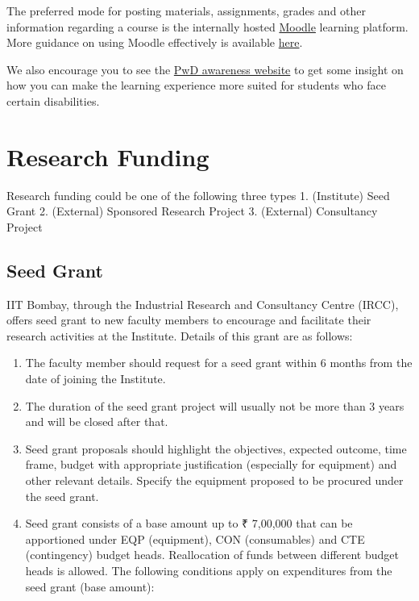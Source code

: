 \documentclass[
  10pt,
  a5paper,
  10pt,
  openany]{amsbook}
\providecommand{\tightlist}{%
  \setlength{\itemsep}{0pt}\setlength{\parskip}{0pt}}
\begin{document}
The preferred mode for posting materials, assignments, grades and other
information regarding a course is the internally hosted
\href{https://moodle.iitb.ac.in}{Moodle} learning platform. More
guidance on using Moodle effectively is available
\href{https://drive.google.com/drive/folders/1U6Z1m-9cR-fP9KWMIqjAWZdOXtJ_lNCf}{here}.

We also encourage you to see the
\href{https://sites.google.com/view/iitb-pwdcell-training}{PwD awareness
website} to get some insight on how you can make the learning experience
more suited for students who face certain disabilities.

\chapter{Research Funding}\label{sec:researchfunding}

Research funding could be one of the following three types 1.
(Institute) Seed Grant 2. (External) Sponsored Research Project 3.
(External) Consultancy Project

\section{Seed Grant}\label{seed-grant}

IIT Bombay, through the Industrial Research and Consultancy Centre
(IRCC), offers seed grant to new faculty members to encourage and
facilitate their research activities at the Institute. Details of this
grant are as follows:

\begin{enumerate}
\def\labelenumi{\arabic{enumi}.}
\tightlist
\item
  The faculty member should request for a seed grant within 6 months
  from the date of joining the Institute.
\item
  The duration of the seed grant project will usually not be more than 3
  years and will be closed after that.
\item
  Seed grant proposals should highlight the objectives, expected
  outcome, time frame, budget with appropriate justification (especially
  for equipment) and other relevant details. Specify the equipment
  proposed to be procured under the seed grant.
\item
  Seed grant consists of a base amount up to ₹ 7,00,000 that can be
  apportioned under EQP (equipment), CON (consumables) and CTE
  (contingency) budget heads. Reallocation of funds between different
  budget heads is allowed. The following conditions apply on
  expenditures from the seed grant (base amount):
\end{enumerate}
\end{document}

